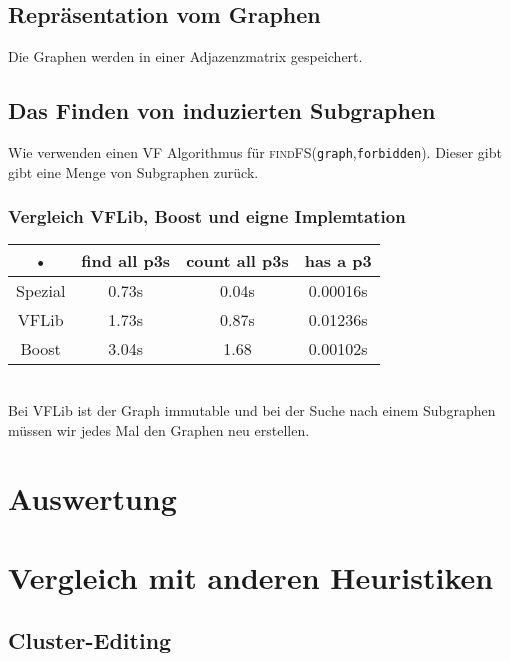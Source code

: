 \documentclass[12pt,a4paper,onecolumn,oneside,titlepage]{article}
\newcommand{\vars}{\texttt}
\newcommand{\func}{\textsc}
\begin{document}
\subsection{Repräsentation vom Graphen}
Die Graphen werden in einer Adjazenzmatrix gespeichert.


\subsection{Das Finden von induzierten Subgraphen}
\cite{Ullmann76}
Wie verwenden einen VF Algorithmus für \func{findFS}(\vars{graph},\vars{forbidden}).
Dieser gibt gibt eine Menge von Subgraphen zurück.

\subsubsection{Vergleich VFLib, Boost und eigne Implemtation}
\begin{tabular}{|c|c|c|c|}
\hline 
• & find all p3s & count all p3s & has a p3 \\ 
\hline 
Spezial & 0.73s & 0.04s & 0.00016s \\ 
\hline 
VFLib & 1.73s & 0.87s & 0.01236s \\ 
\hline 
Boost & 3.04s & 1.68 & 0.00102s \\ 
\hline 
\end{tabular} 
\\

Bei VFLib ist der Graph immutable und bei der Suche nach einem  Subgraphen müssen wir jedes Mal den Graphen neu erstellen.


\section{Auswertung}

\section{Vergleich mit anderen Heuristiken}
\subsection{Cluster-Editing}
\end{document}
